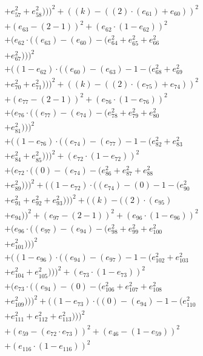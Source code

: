 \documentclass[10pt, a4paper]{article}
\begin{document}
\begin{align*}
& + e_{57}^{2} + e_{58}^{2})))^{2} + ((k) - ((2)  \cdot  (e_{61}) + e_{60}))^{2} \\
& + (e_{63} - (2 - 1))^{2} + (e_{62}  \cdot  (1 - e_{62}))^{2} \\
& + (e_{62}  \cdot  ((e_{63}) - (e_{60}) - (e_{64}^{2} + e_{65}^{2} + e_{66}^{2} \\
& + e_{67}^{2})))^{2} \\
& + ((1 - e_{62})  \cdot  ((e_{60}) - (e_{63}) - 1 - (e_{68}^{2} + e_{69}^{2} \\
& + e_{70}^{2} + e_{71}^{2})))^{2} + ((k) - ((2)  \cdot  (e_{75}) + e_{74}))^{2} \\
& + (e_{77} - (2 - 1))^{2} + (e_{76}  \cdot  (1 - e_{76}))^{2} \\
& + (e_{76}  \cdot  ((e_{77}) - (e_{74}) - (e_{78}^{2} + e_{79}^{2} + e_{80}^{2} \\
& + e_{81}^{2})))^{2} \\
& + ((1 - e_{76})  \cdot  ((e_{74}) - (e_{77}) - 1 - (e_{82}^{2} + e_{83}^{2} \\
& + e_{84}^{2} + e_{85}^{2})))^{2} + (e_{72}  \cdot  (1 - e_{72}))^{2} \\
& + (e_{72}  \cdot  ((0) - (e_{74}) - (e_{86}^{2} + e_{87}^{2} + e_{88}^{2} \\
& + e_{89}^{2})))^{2} + ((1 - e_{72})  \cdot  ((e_{74}) - (0) - 1 - (e_{90}^{2} \\
& + e_{91}^{2} + e_{92}^{2} + e_{93}^{2})))^{2} + ((k) - ((2)  \cdot  (e_{95}) \\
& + e_{94}))^{2} + (e_{97} - (2 - 1))^{2} + (e_{96}  \cdot  (1 - e_{96}))^{2} \\
& + (e_{96}  \cdot  ((e_{97}) - (e_{94}) - (e_{98}^{2} + e_{99}^{2} + e_{100}^{2} \\
& + e_{101}^{2})))^{2} \\
& + ((1 - e_{96})  \cdot  ((e_{94}) - (e_{97}) - 1 - (e_{102}^{2} + e_{103}^{2} \\
& + e_{104}^{2} + e_{105}^{2})))^{2} + (e_{73}  \cdot  (1 - e_{73}))^{2} \\
& + (e_{73}  \cdot  ((e_{94}) - (0) - (e_{106}^{2} + e_{107}^{2} + e_{108}^{2} \\
& + e_{109}^{2})))^{2} + ((1 - e_{73})  \cdot  ((0) - (e_{94}) - 1 - (e_{110}^{2} \\
& + e_{111}^{2} + e_{112}^{2} + e_{113}^{2})))^{2} \\
& + (e_{59} - (e_{72}  \cdot  e_{73}))^{2} + (e_{46} - (1 - e_{59}))^{2} \\
& + (e_{116}  \cdot  (1 - e_{116}))^{2} \\

\end{align*}
\end{document}
